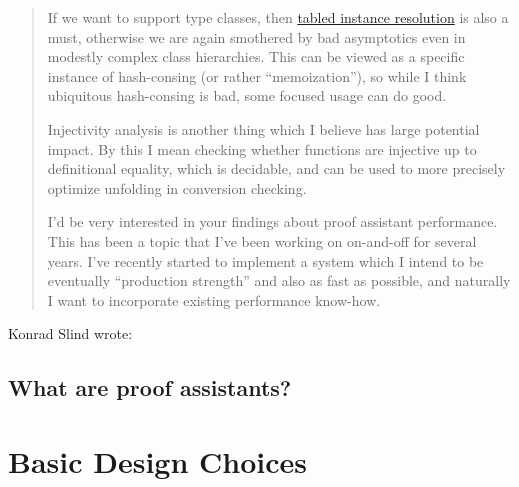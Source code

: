 \begin{quotation}
If we want to support type classes, then \href{https://arxiv.org/pdf/2001.04301.pdf}{tabled instance resolution} \textcite{Tabled2020Selsam} is also a must, otherwise we are again smothered by bad asymptotics even in modestly complex class hierarchies. This can be viewed as a specific instance of hash-consing (or rather ``memoization''), so while I think ubiquitous hash-consing is bad, some focused usage can do good.

Injectivity analysis is another thing which I believe has large potential impact. By this I mean checking whether functions are injective up to definitional equality, which is decidable, and can be used to more precisely optimize unfolding in conversion checking.

I'd be very interested in your findings about proof assistant performance. This has been a topic that I've been working on on-and-off for several years. I've recently started to implement a system which I intend to be eventually ``production strength'' and also as fast as possible, and naturally I want to incorporate existing performance know-how.
\end{quotation}
Konrad Slind wrote:

\subsection{What are proof assistants?}

\section{Basic Design Choices}

